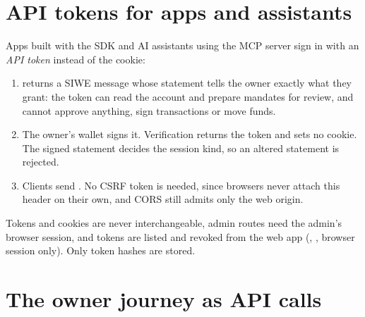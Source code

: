 \section{API tokens for apps and assistants}

Apps built with the SDK and AI assistants using the MCP server sign in with an \emph{API token} instead of the cookie:

\begin{enumerate}
  \item {} returns a SIWE message whose statement tells the owner exactly what they grant: the token can read the account and prepare mandates for review, and cannot approve anything, sign transactions or move funds.
  \item The owner's wallet signs it. Verification returns the token and sets no cookie. The signed statement decides the session kind, so an altered statement is rejected.
  \item Clients send . No CSRF token is needed, since browsers never attach this header on their own, and CORS still admits only the web origin.
\end{enumerate}

Tokens and cookies are never interchangeable, admin routes need the admin's browser session, and tokens are listed and revoked from the web app (, , browser session only). Only token hashes are stored.

\section{The owner journey as API calls}

